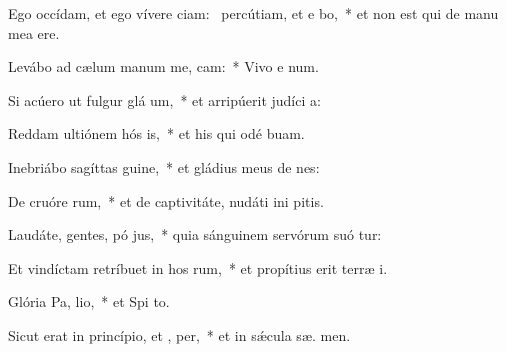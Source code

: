 \item Ego occídam, et ego vívere ciam:~\pscross{} percútiam, et e bo,~* et non est qui de manu mea  ere.
\item Levábo ad cælum manum me,  cam:~* Vivo e  num.
\item Si acúero ut fulgur glá um,~* et arripúerit judíci  a:
\item Reddam ultiónem hós is,~* et his qui odé  buam.
\item Inebriábo sagíttas  guine,~* et gládius meus de nes:
\item De cruóre rum,~* et de captivitáte, nudáti ini pitis.
\item Laudáte, gentes, pó jus,~* quia sánguinem servórum suó tur:
\item Et vindíctam retríbuet in hos rum,~* et propítius erit terræ  i.
\item \singlecolsep
\item Glória Pa,  lio,~* et Spi to.
\item Sicut erat in princípio, et ,  per,~* et in sǽcula sæ. men.

